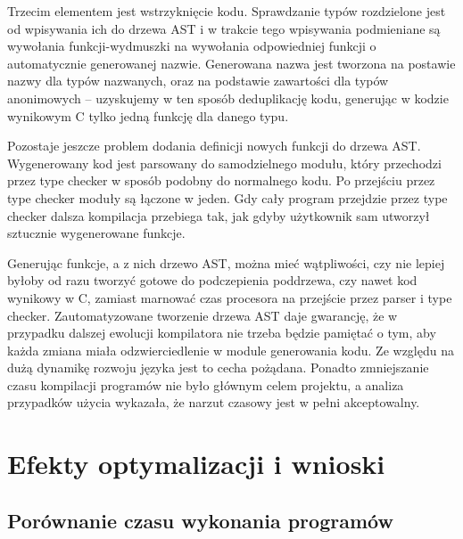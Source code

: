 \documentclass[licencjacka]{pracamgr}
\begin{document}
Trzecim elementem jest wstrzyknięcie kodu. Sprawdzanie typów rozdzielone jest od wpisywania ich do drzewa AST
i w trakcie tego wpisywania podmieniane są wywołania funkcji-wydmuszki na wywołania
odpowiedniej funkcji o automatycznie generowanej nazwie. Generowana nazwa jest tworzona na postawie nazwy dla typów nazwanych, oraz na podstawie zawartości
dla typów anonimowych -- uzyskujemy w ten sposób deduplikację kodu, generując w kodzie wynikowym C tylko jedną funkcję dla danego typu.

Pozostaje jeszcze problem dodania definicji nowych funkcji do drzewa AST. Wygenerowany kod jest parsowany do samodzielnego modułu,
który przechodzi przez type checker w sposób podobny do normalnego kodu. Po przejściu przez type checker moduły są łączone w jeden. Gdy cały program przejdzie przez type checker
dalsza kompilacja przebiega tak, jak gdyby użytkownik sam utworzył sztucznie wygenerowane funkcje.

Generując funkcje, a z nich drzewo AST, można mieć wątpliwości, czy nie lepiej byłoby od razu tworzyć gotowe do podczepienia poddrzewa, czy nawet kod wynikowy w C,
zamiast marnować czas procesora na przejście przez parser i type checker. 
Zautomatyzowane tworzenie drzewa AST daje gwarancję, że w przypadku dalszej ewolucji kompilatora nie trzeba będzie pamiętać o tym,
aby każda zmiana miała odzwierciedlenie w module generowania kodu. Ze względu na dużą dynamikę rozwoju języka jest to cecha pożądana.
Ponadto zmniejszanie czasu kompilacji programów nie było głównym celem projektu, a analiza przypadków użycia wykazała, że narzut czasowy jest w pełni akceptowalny.

\chapter{Efekty optymalizacji i wnioski}
\section{Porównanie czasu wykonania programów}
\end{document}
